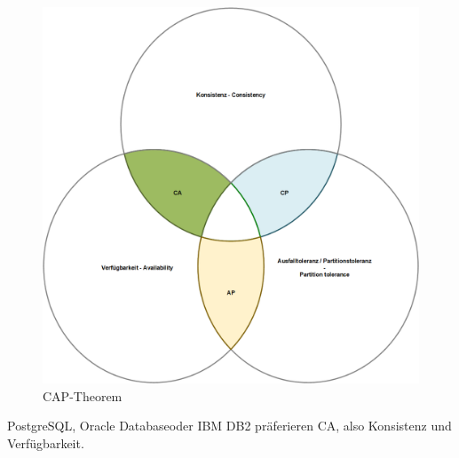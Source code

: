 \begin{flushleft}
    \begin{figure}[H]
        \centering
        \includegraphics[width=1\linewidth]{source/implementation/evaluation/excursus_architecture/cap_theorem}
        \caption{CAP-Theorem}
        \label{fig:cap_theorem}
    \end{figure}

    \Gls{PostgreSQL}, \Gls{Oracle Database}oder \Gls{IBM DB2} präferieren CA, also Konsistenz und Verfügbarkeit.
\end{flushleft}